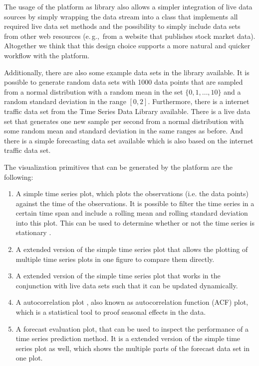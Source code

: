 \documentclass[runningheads,a4paper,11pt]{llncs}
\newcommand{\eg}{e.\,g.,\ }
\begin{document}
The usage of the platform as library also allows a simpler integration of live data sources by simply wrapping the data stream into a class that implements all required live data set methods and the possibility to simply include data sets from other web resources (\eg from a website that publishes stock market data).
Altogether we think that this design choice supports a more natural and quicker workflow with the platform.

Additionally, there are also some example data sets in the library available.
It is possible to generate random data sets with 1000 data points that are sampled from a normal distribution with a random mean in the set \(\{0,1,\ldots,10\}\) and a random standard deviation in the range \([0,2]\).
Furthermore, there is a internet traffic data set from the Time Series Data Library \cite{TSDL} available.
There is a live data set that generates one new sample per second from a normal distribution with some random mean and standard deviation in the same ranges as before.
And there is a simple forecasting data set available which is also based on the internet traffic data set.

The visualization primitives that can be generated by the platform are the following:

\begin{enumerate}
 \item A simple time series plot, which plots the observations (i.e. the data points) against the time of the observations.
 It is possible to filter the time series in a certain time span and include a rolling mean and rolling standard deviation into this plot.
 This can be used to determine whether or not the time series is stationary \cite{Nason2006}.
 
 \item A extended version of the simple time series plot that allows the plotting of multiple time series plots in one figure to compare them directly.
 
 \item A extended version of the simple time series plot that works in the conjunction with live data sets such that it can be updated dynamically. 
 
 \item A autocorrelation plot \cite{Box1976}, also known as autocorrelation function (ACF) plot, which is a statistical tool to proof seasonal effects in the data. 
 
 \item A forecast evaluation plot, that can be used to inspect the performance of a time series prediction method. 
 It is a extended version of the simple time series plot as well, which shows the multiple parts of the forecast data set in one plot. 
\end{enumerate}
\end{document}
